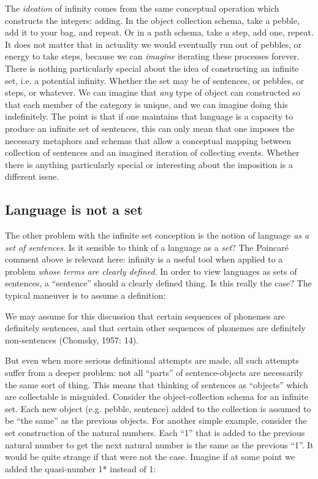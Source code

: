   The \textit{ideation} of infinity comes from the same conceptual operation which constructs the integers: adding. In the object collection schema, take a pebble, add it to your bag, and repeat. Or in a path schema, take a step, add one, repeat. It does not matter that in actuality we would eventually run out of pebbles, or energy to take steps, because we can \textit{imagine} iterating these processes forever. There is nothing particularly special about the idea of constructing an infinite set, i.e. a potential infinity. Whether the set may be of sentences, or pebbles, or steps, or whatever. We can imagine that \textit{any} type of object can constructed so that each member of the category is unique, and we can imagine doing this indefinitely. The point is that if one maintains that language is a capacity to produce an infinite set of sentences, this can only mean that one imposes the necessary metaphors and schemas that allow a conceptual mapping between collection of sentences and an imagined iteration of collecting events. Whether there is anything particularly special or interesting about the imposition is a different issue.

\subsection{Language is not a set}

The other problem with the infinite set conception is the notion of language \textit{as a set of sentences}. Is it sensible to think of a language as a \textit{set}? The Poincaré comment above is relevant here: infinity is a useful tool when applied to a problem \textit{whose terms are clearly defined}. In order to view languages as sets of sentences, a “sentence” should a clearly defined thing. Is this really the case? The typical maneuver is to assume a definition:

We may assume for this discussion that certain sequences of phonemes are definitely sentences, and that certain other sequences of phonemes are definitely non-sentences (Chomsky, 1957: 14).

  But even when more serious definitional attempts are made, all such attempts suffer from a deeper problem: not all “parts” of sentence-objects are necessarily the same sort of thing. This means that thinking of sentences as “objects” which are collectable is misguided. Consider the object-collection schema for an infinite set. Each new object (e.g. pebble, sentence) added to the collection is assumed to be “the same” as the previous objects. For another simple example, consider the set construction of the natural numbers. Each “1” that is added to the previous natural number to get the next natural number is the same as the previous “1”. It would be quite strange if that were not the case. Imagine if at some point we added the quasi-number 1* instead of 1:

